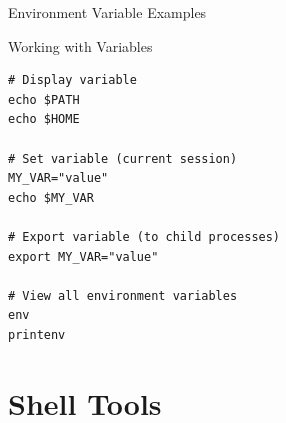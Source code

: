 \documentclass[presentation,aspectratio=1610]{beamer}
\begin{document}
\begin{frame}[label={sec:orgbb0ff49},fragile]{Environment Variable Examples}
 \begin{block}{Working with Variables}
\begin{verbatim}
# Display variable
echo $PATH
echo $HOME

# Set variable (current session)
MY_VAR="value"
echo $MY_VAR

# Export variable (to child processes)
export MY_VAR="value"

# View all environment variables
env
printenv
\end{verbatim}
\end{block}
\end{frame}
\section*{Shell Tools}
\label{sec:orgdc9ee6a}
\end{document}
